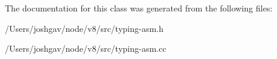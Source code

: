 The documentation for this class was generated from the following files\+:\begin{DoxyCompactItemize}
\item 
/\+Users/joshgav/node/v8/src/typing-\/asm.\+h\item 
/\+Users/joshgav/node/v8/src/typing-\/asm.\+cc\end{DoxyCompactItemize}
